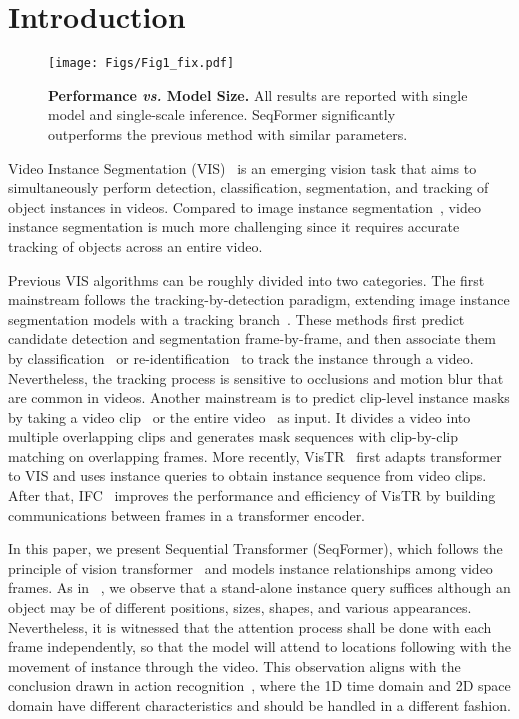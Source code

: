 \documentclass[runningheads]{llncs}
\begin{document}
\section{Introduction}


\begin{figure}[tb]
\centering
\texttt{[image: Figs/Fig1\_fix.pdf]}
\caption{\textbf{Performance \emph{vs.} Model Size.} All results are reported with single model and single-scale inference. SeqFormer significantly outperforms the previous method with similar parameters.}

\label{fig1}
\end{figure}

Video Instance Segmentation (VIS)~\cite{yang2019video,ovis} is an emerging vision task that aims to simultaneously perform detection, classification, segmentation, and tracking of object instances in videos. Compared to image instance segmentation~\cite{MaskRCNN}, video instance segmentation is much more challenging since it requires accurate tracking of objects across an entire video.




Previous VIS algorithms can be roughly divided into two categories.
The first mainstream follows the tracking-by-detection paradigm, extending image instance segmentation models with a tracking branch~\cite{yang2019video,cao2020sipmask,yang2021crossover,liu2021sg,1stYTVIS21,MSN}. These methods first predict candidate detection and segmentation frame-by-frame, and then associate them by classification~\cite{yang2019video,yang2021crossover} or re-identification~\cite{cao2020sipmask,liu2021sg} to track the instance through a video. Nevertheless, the tracking process is sensitive to occlusions and motion blur that are common in videos.
Another mainstream is to predict clip-level instance masks by taking a video clip~\cite{athar2020stem,MaskProp} or the entire video~\cite{IFC,VisTR} as input. It divides a video into multiple overlapping clips and generates mask sequences with clip-by-clip matching on overlapping frames. 
More recently, VisTR~\cite{VisTR} first adapts transformer~\cite{transformers} to VIS and uses instance queries to obtain instance sequence from video clips. After that, IFC~\cite{IFC} improves the performance and efficiency of VisTR by building communications between frames in a transformer encoder.


In this paper, we present Sequential Transformer (SeqFormer), which follows the principle of vision transformer~\cite{detr,VisTR} and models instance relationships among video frames. As in ~\cite{IFC}, we observe that a stand-alone instance query suffices although an object may be of different positions, sizes, shapes, and various appearances. Nevertheless, it is witnessed that the attention process shall be done with each frame independently, so that the model will attend to locations following with the movement of instance through the video. This observation aligns with the conclusion drawn in action recognition~\cite{zhao2018trajectory,MotionFormer}, where the 1D time domain and 2D space domain have different characteristics and should be handled in a different fashion.
\end{document}
